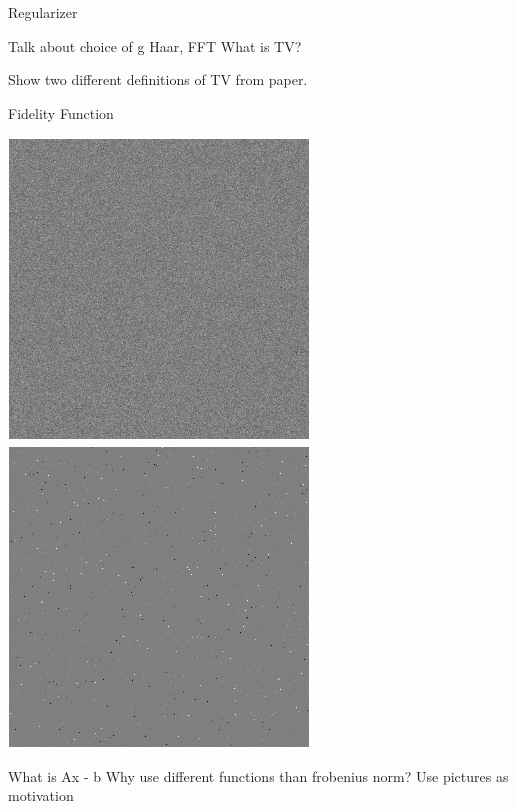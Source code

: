 \documentclass[12pt]{beamer}
\begin{document}
\begin{frame}{Regularizer}

Talk about choice of g
Haar, FFT
What is TV?

Show two different definitions of TV from paper.

\end{frame}

\begin{frame}{Fidelity Function}

\begin{minipage}{0.45\textwidth}

\begin{center}
\vspace{-2 mm}
\includegraphics[scale=0.35]{gaussian_noise.png} \\
\includegraphics[scale=0.35]{student_t_noise.png} 
\end{center}

\end{minipage} \hfill
\begin{minipage}{0.52\textwidth}

What is Ax - b
Why use different functions than frobenius norm?  Use pictures as motivation

\end{minipage}

\end{frame}
\end{document}
